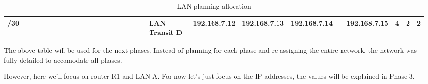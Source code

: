 \documentclass[11pt,a4paper]{report}
\begin{document}
\begin{table}[]
\begin{tabular}{rlllllllllllllllllllllllllll}
/30                                          &                      & \cellcolor[HTML]{9698ED} & \cellcolor[HTML]{9698ED} &                          &                          &                          &                          &                          &                          &                          &                          &                          &                          &                          &                          &                          &                          &  & LAN Transit D          & 192.168.7.12              & 192.168.7.13                      & 192.168.7.14                     &                          & 192.168.7.15                & 4                          & 2                         & 2                           \\ \hline
\end{tabular}
\caption{LAN planning allocation}
\label{tab:lanalloc}
\end{table}

The above table will be used for the next phases. Instead of planning for each phase and re-assigning the entire network, the network was fully detailed to accomodate all phases.

However, here we'll focus on router R1 and LAN A. For now let's just focus on the IP addresses, the values will be explained in Phase 3.
\end{document}
